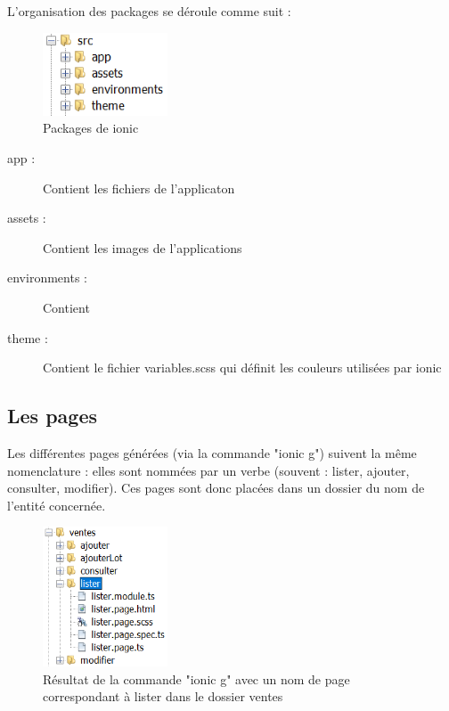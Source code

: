 			L'organisation des packages se déroule comme suit :

			\begin{figure}[H]
				\centering\includegraphics[width=0.33\textwidth, keepaspectratio]{res/ionicPackage.png}
				\caption{Packages de ionic}
			\end{figure}

			\begin{description}
				\item[app :]{Contient les fichiers de l'applicaton}
				\item[assets :]{Contient les images de l'applications}
				\item[environments :]{Contient } %
				\item[theme :]{Contient le fichier variables.scss qui définit les couleurs utilisées par ionic}
			\end{description}

		\subsection{Les pages}

			Les différentes pages générées (via la commande "ionic g") suivent la même nomenclature : elles sont nommées par un verbe (souvent : lister, ajouter, consulter, modifier). Ces pages sont donc placées dans un dossier du nom de l'entité concernée.\newline

			\begin{figure}[H]
				\centering\includegraphics[width=0.33\textwidth, keepaspectratio]{res/ionicListerVentes.png}
				\caption{Résultat de la commande "ionic g" avec un nom de page correspondant à lister dans le dossier ventes}
			\end{figure}

